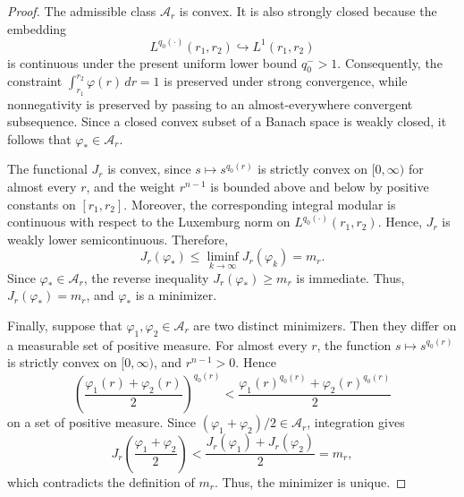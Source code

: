 \documentclass[12pt]{amsart}
\numberwithin{equation}{section}
\theoremstyle{plain}
\theoremstyle{definition}
\begin{document}
\begin{proof}
The admissible class $\mathcal A_r$ is convex. It is also strongly
closed because the embedding
\begin{equation*}
L^{q_0(\cdot)}(r_1,r_2)\hookrightarrow L^1(r_1,r_2)
\end{equation*}
is continuous under the present uniform lower bound $q_0^->1$.
Consequently, the constraint
$\int_{r_1}^{r_2}\varphi(r)\,dr=1$
is preserved under strong convergence, while nonnegativity is preserved
by passing to an almost-everywhere convergent subsequence. Since a
closed convex subset of a Banach space is weakly closed, it follows that
$\varphi_*\in\mathcal A_r$.

The functional $J_r$ is convex, since
$s\mapsto s^{q_0(r)}$ is strictly convex on $[0,\infty)$ for almost every
$r$, and the weight $r^{n-1}$ is bounded above and below by positive
constants on $[r_1,r_2]$. Moreover, the corresponding integral modular
is continuous with respect to the Luxemburg norm on
$L^{q_0(\cdot)}(r_1,r_2)$. Hence, $J_r$ is weakly lower semicontinuous.
Therefore,
\begin{equation*}
J_r(\varphi_*)
\le
\liminf_{k\to\infty}J_r(\varphi_k)
=
m_r.
\end{equation*}
Since $\varphi_*\in\mathcal A_r$, the reverse inequality
$J_r(\varphi_*)\ge m_r$ is immediate. Thus,
$J_r(\varphi_*)=m_r$,
and $\varphi_*$ is a minimizer.

Finally, suppose that $\varphi_1,\varphi_2\in\mathcal A_r$ are two
distinct minimizers. Then they differ on a measurable set of positive
measure. For almost every $r$, the function
$s\mapsto s^{q_0(r)}$ is strictly convex on $[0,\infty)$, and
$r^{n-1}>0$. Hence
\begin{equation*}
\left(\frac{\varphi_1(r)+\varphi_2(r)}{2}\right)^{q_0(r)}
<
\frac{\varphi_1(r)^{q_0(r)}
+\varphi_2(r)^{q_0(r)}}{2}
\end{equation*}
on a set of positive measure. Since
$(\varphi_1+\varphi_2)/2\in\mathcal A_r$, integration gives
\begin{equation*}
J_r\left(\frac{\varphi_1+\varphi_2}{2}\right)
<
\frac{J_r(\varphi_1)+J_r(\varphi_2)}{2}
=
m_r,
\end{equation*}
which contradicts the definition of $m_r$. Thus, the minimizer is unique.
\end{proof}
\end{document}
